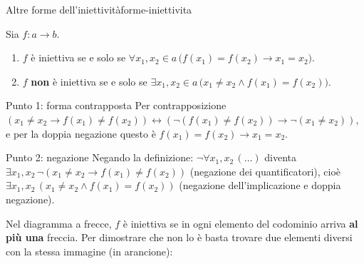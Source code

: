 \begin{concetto}
\begin{Proposizione}{Altre forme dell'iniettività}{forme-iniettivita}
    \begin{prerequisiti}
    \end{prerequisiti}
    Sia $f \colon a \to b$.
    \begin{enumerate}
        \item $f$ è iniettiva se e solo se $\forall x_1, x_2 \in a\,\big(f(x_1) = f(x_2) \rightarrow x_1 = x_2\big)$.
        \item $f$ \textbf{non} è iniettiva se e solo se $\exists x_1, x_2 \in a\,\big(x_1 \neq x_2 \wedge f(x_1) = f(x_2)\big)$.
    \end{enumerate}
\end{Proposizione}
\begin{dimostrazione}
    \begin{caso}{Punto 1: forma contrapposta}
        Per contrapposizione $(x_1 \neq x_2 \rightarrow f(x_1) \neq f(x_2)) \leftrightarrow (\neg(f(x_1) \neq f(x_2)) \rightarrow \neg(x_1 \neq x_2))$,
        e per la doppia negazione questo è $f(x_1) = f(x_2) \rightarrow x_1 = x_2$.
    \end{caso}
    \begin{caso}{Punto 2: negazione}
        Negando la definizione: $\neg\forall x_1, x_2\,(\dots)$ diventa $\exists x_1, x_2\,\neg(x_1 \neq x_2 \rightarrow f(x_1) \neq f(x_2))$
        (negazione dei quantificatori), cioè $\exists x_1, x_2\,(x_1 \neq x_2 \wedge f(x_1) = f(x_2))$ (negazione dell'implicazione e doppia negazione).
    \end{caso}
\end{dimostrazione}
\end{concetto}

\begin{spiegazione}
    Nel diagramma a frecce, $f$ è iniettiva se in ogni elemento del codominio arriva \textbf{al più una} freccia. Per dimostrare che non lo è basta
    trovare due elementi diversi con la stessa immagine (in arancione):
    \begin{center}
    \end{center}
\end{spiegazione}


